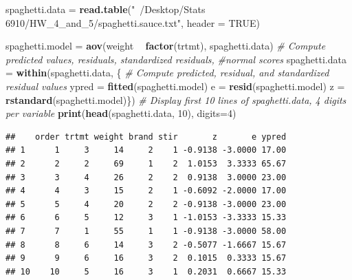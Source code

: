 \documentclass[12pt,]{article}
\newenvironment{Shaded}{\begin{snugshade}}{\end{snugshade}}
\newcommand{\KeywordTok}[1]{\textcolor[rgb]{0.13,0.29,0.53}{\textbf{#1}}}
\newcommand{\DataTypeTok}[1]{\textcolor[rgb]{0.13,0.29,0.53}{#1}}
\newcommand{\DecValTok}[1]{\textcolor[rgb]{0.00,0.00,0.81}{#1}}
\newcommand{\StringTok}[1]{\textcolor[rgb]{0.31,0.60,0.02}{#1}}
\newcommand{\CommentTok}[1]{\textcolor[rgb]{0.56,0.35,0.01}{\textit{#1}}}
\newcommand{\OtherTok}[1]{\textcolor[rgb]{0.56,0.35,0.01}{#1}}
\newcommand{\OperatorTok}[1]{\textcolor[rgb]{0.81,0.36,0.00}{\textbf{#1}}}
\newcommand{\NormalTok}[1]{#1}
\begin{document}
\begin{Shaded}
\begin{Highlighting}[]
\NormalTok{spaghetti.data =}\StringTok{ }\KeywordTok{read.table}\NormalTok{(}\StringTok{"~/Desktop/Stats 6910/HW_4_and_5/spaghetti.sauce.txt"}\NormalTok{, }
                            \DataTypeTok{header =} \OtherTok{TRUE}\NormalTok{)}

\NormalTok{spaghetti.model =}\StringTok{ }\KeywordTok{aov}\NormalTok{(weight }\OperatorTok{~}\StringTok{ }\KeywordTok{factor}\NormalTok{(trtmt), spaghetti.data)}
\CommentTok{# Compute predicted values, residuals, standardized residuals, }
\CommentTok{#normal scores}
\NormalTok{spaghetti.data =}\StringTok{ }\KeywordTok{within}\NormalTok{(spaghetti.data, \{}
  \CommentTok{# Compute predicted, residual, and standardized residual values}
\NormalTok{  ypred =}\StringTok{ }\KeywordTok{fitted}\NormalTok{(spaghetti.model)}
\NormalTok{  e =}\StringTok{ }\KeywordTok{resid}\NormalTok{(spaghetti.model) }
\NormalTok{  z =}\StringTok{ }\KeywordTok{rstandard}\NormalTok{(spaghetti.model)\})}
\CommentTok{# Display first 10 lines of spaghetti.data, 4 digits per variable}
\KeywordTok{print}\NormalTok{(}\KeywordTok{head}\NormalTok{(spaghetti.data, }\DecValTok{10}\NormalTok{), }\DataTypeTok{digits=}\DecValTok{4}\NormalTok{)}
\end{Highlighting}
\end{Shaded}

\begin{verbatim}
##    order trtmt weight brand stir       z       e ypred
## 1      1     3     14     2    1 -0.9138 -3.0000 17.00
## 2      2     2     69     1    2  1.0153  3.3333 65.67
## 3      3     4     26     2    2  0.9138  3.0000 23.00
## 4      4     3     15     2    1 -0.6092 -2.0000 17.00
## 5      5     4     20     2    2 -0.9138 -3.0000 23.00
## 6      6     5     12     3    1 -1.0153 -3.3333 15.33
## 7      7     1     55     1    1 -0.9138 -3.0000 58.00
## 8      8     6     14     3    2 -0.5077 -1.6667 15.67
## 9      9     6     16     3    2  0.1015  0.3333 15.67
## 10    10     5     16     3    1  0.2031  0.6667 15.33
\end{verbatim}
\end{document}
